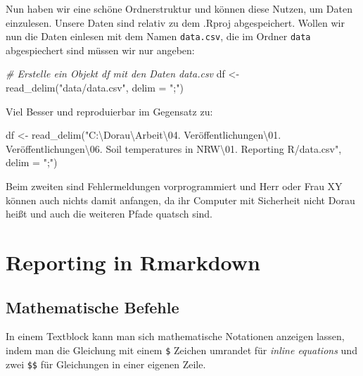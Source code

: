 \documentclass[
]{article}
\newenvironment{Shaded}{\begin{snugshade}}{\end{snugshade}}
\newcommand{\AttributeTok}[1]{\textcolor[rgb]{0.77,0.63,0.00}{#1}}
\newcommand{\CommentTok}[1]{\textcolor[rgb]{0.56,0.35,0.01}{\textit{#1}}}
\newcommand{\FunctionTok}[1]{\textcolor[rgb]{0.00,0.00,0.00}{#1}}
\newcommand{\NormalTok}[1]{#1}
\newcommand{\OtherTok}[1]{\textcolor[rgb]{0.56,0.35,0.01}{#1}}
\newcommand{\SpecialCharTok}[1]{\textcolor[rgb]{0.00,0.00,0.00}{#1}}
\newcommand{\StringTok}[1]{\textcolor[rgb]{0.31,0.60,0.02}{#1}}
\begin{document}
Nun haben wir eine schöne Ordnerstruktur und können diese Nutzen, um Daten einzulesen. Unsere Daten sind relativ zu dem .Rproj abgespeichert. Wollen wir nun die Daten einlesen mit dem Namen \texttt{data.csv}, die im Ordner \texttt{data} abgespiechert sind müssen wir nur angeben:

\begin{Shaded}
\begin{Highlighting}[]
\CommentTok{\# Erstelle ein Objekt df mit den Daten data.csv}
\NormalTok{df }\OtherTok{\textless{}{-}} \FunctionTok{read\_delim}\NormalTok{(}\StringTok{"data/data.csv"}\NormalTok{, }\AttributeTok{delim =} \StringTok{";"}\NormalTok{)}
\end{Highlighting}
\end{Shaded}

Viel Besser und reproduierbar im Gegensatz zu:

\begin{Shaded}
\begin{Highlighting}[]
\NormalTok{df }\OtherTok{\textless{}{-}} \FunctionTok{read\_delim}\NormalTok{(}\StringTok{"C:\textbackslash{}Dorau\textbackslash{}Arbeit}\SpecialCharTok{\textbackslash{}04}\StringTok{. Veröffentlichungen}\SpecialCharTok{\textbackslash{}01}\StringTok{. Veröffentlichungen}\SpecialCharTok{\textbackslash{}06}\StringTok{. Soil temperatures in NRW}\SpecialCharTok{\textbackslash{}01}\StringTok{. Reporting R/data.csv"}\NormalTok{, }\AttributeTok{delim =} \StringTok{";"}\NormalTok{)}
\end{Highlighting}
\end{Shaded}

Beim zweiten sind Fehlermeldungen vorprogrammiert und Herr oder Frau XY können auch nichts damit anfangen, da ihr Computer mit Sicherheit nicht Dorau heißt und auch die weiteren Pfade quatsch sind.

\hypertarget{reporting-in-rmarkdown}{%
\section{Reporting in Rmarkdown}\label{reporting-in-rmarkdown}}

\hypertarget{mathematische-befehle}{%
\subsection{Mathematische Befehle}\label{mathematische-befehle}}

In einem Textblock kann man sich mathematische Notationen anzeigen lassen, indem man die Gleichung mit einem \texttt{\$} Zeichen umrandet für \emph{inline equations} und zwei \texttt{\$\$} für Gleichungen in einer eigenen Zeile.
\end{document}
